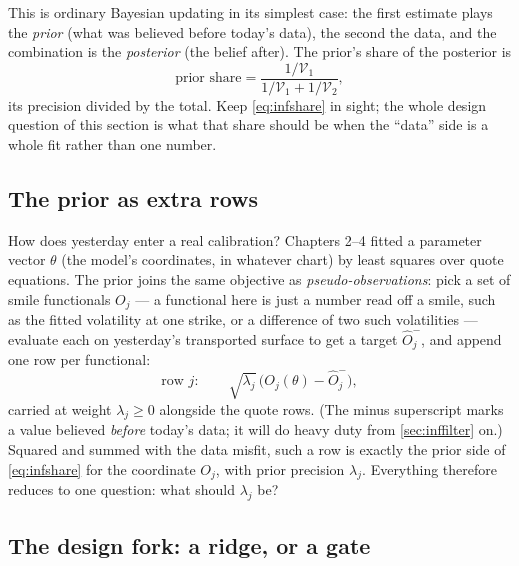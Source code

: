 This is ordinary Bayesian updating in its simplest case: the
first estimate plays the \emph{prior} (what was believed before
today's data), the second the data, and the combination is the
\emph{posterior} (the belief after).  The prior's share of the
posterior is
\begin{equation}
\text{prior share}
=\frac{1/\mathcal{V}_1}{1/\mathcal{V}_1+1/\mathcal{V}_2},
\label{eq:infshare}
\end{equation}
its precision divided by the total.  Keep \cref{eq:infshare} in
sight; the whole design question of this section is what that share
should be when the ``data'' side is a whole fit rather than one
number.

\subsection{The prior as extra rows}

How does yesterday enter a real calibration?  Chapters 2--4 fitted a
parameter vector $\theta$ (the model's coordinates, in whatever
chart) by least squares over quote equations.  The prior joins the
same objective as \emph{pseudo-observations}: pick a set of smile
functionals $O_j$ --- a functional here is just a number read off a
smile, such as the fitted volatility at one strike, or a difference
of two such volatilities --- evaluate each on yesterday's transported
surface to get a target $\hat O_j^{-}$, and append one row per
functional:
\begin{equation}
\text{row } j:\qquad
\sqrt{\lambda_j}\,\bigl(O_j(\theta)-\hat O_j^{-}\bigr),
\label{eq:infrow}
\end{equation}
carried at weight $\lambda_j\ge0$ alongside the quote rows.  (The
minus superscript marks a value believed \emph{before} today's data;
it will do heavy duty from \cref{sec:inffilter} on.)  Squared and
summed with the data misfit, such a row is exactly the prior side of
\cref{eq:infshare} for the coordinate $O_j$, with prior precision
$\lambda_j$.  Everything therefore reduces to one question: what
should $\lambda_j$ be?

\subsection{The design fork: a ridge, or a gate}

